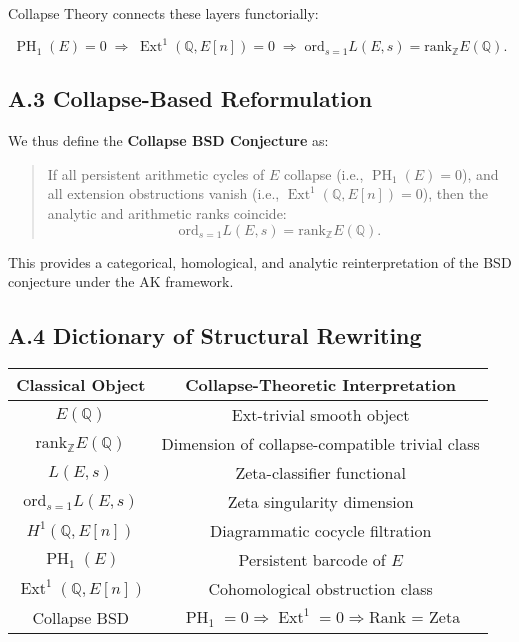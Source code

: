 \documentclass[11pt]{article}
\DeclareMathOperator{\Ext}{Ext}
\DeclareMathOperator{\PH}{PH}
\newcommand{\QQ}{\mathbb{Q}}
\newcommand{\ZZ}{\mathbb{Z}}
\begin{document}
Collapse Theory connects these layers functorially:

\[
\PH_1(E) = 0 \;\Rightarrow\; \Ext^1(\QQ,E[n]) = 0 \;\Rightarrow\; \mathrm{ord}_{s=1} L(E,s) = \mathrm{rank}_{\ZZ} E(\QQ).
\]

\subsection*{A.3 Collapse-Based Reformulation}

We thus define the \textbf{Collapse BSD Conjecture} as:

\begin{quote}
If all persistent arithmetic cycles of $E$ collapse (i.e., $\PH_1(E) = 0$), and all extension obstructions vanish (i.e., $\Ext^1(\QQ,E[n]) = 0$),  
then the analytic and arithmetic ranks coincide:
\[
\mathrm{ord}_{s=1} L(E,s) = \mathrm{rank}_{\ZZ} E(\QQ).
\]
\end{quote}

This provides a categorical, homological, and analytic reinterpretation of the BSD conjecture under the AK framework.

\subsection*{A.4 Dictionary of Structural Rewriting}

\begin{center}
\begin{tabular}{|c|c|}
\hline
\textbf{Classical Object} & \textbf{Collapse-Theoretic Interpretation} \\
\hline
$E(\QQ)$ & Ext-trivial smooth object \\
\hline
$\mathrm{rank}_{\ZZ} E(\QQ)$ & Dimension of collapse-compatible trivial class \\
\hline
$L(E,s)$ & Zeta-classifier functional \\
\hline
$\mathrm{ord}_{s=1} L(E,s)$ & Zeta singularity dimension \\
\hline
$H^1(\QQ,E[n])$ & Diagrammatic cocycle filtration \\
\hline
$\PH_1(E)$ & Persistent barcode of $E$ \\
\hline
$\Ext^1(\QQ,E[n])$ & Cohomological obstruction class \\
\hline
Collapse BSD & $\PH_1 = 0 \Rightarrow \Ext^1 = 0 \Rightarrow \text{Rank = Zeta}$ \\
\hline
\end{tabular}
\end{center}
\end{document}
